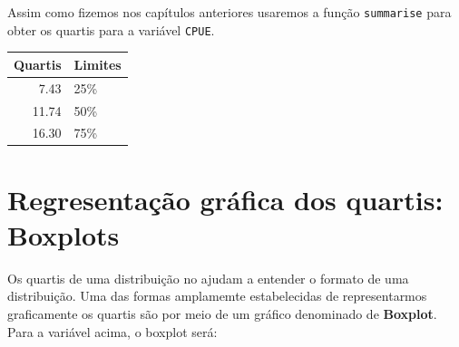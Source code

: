 \documentclass[
]{book}
\newenvironment{Shaded}{\begin{snugshade}}{\end{snugshade}}
\newcommand{\AttributeTok}[1]{\textcolor[rgb]{0.77,0.63,0.00}{#1}}
\newcommand{\FloatTok}[1]{\textcolor[rgb]{0.00,0.00,0.81}{#1}}
\newcommand{\FunctionTok}[1]{\textcolor[rgb]{0.00,0.00,0.00}{#1}}
\newcommand{\NormalTok}[1]{#1}
\newcommand{\SpecialCharTok}[1]{\textcolor[rgb]{0.00,0.00,0.00}{#1}}
\newcommand{\StringTok}[1]{\textcolor[rgb]{0.31,0.60,0.02}{#1}}
\begin{document}
Assim como fizemos nos capítulos anteriores usaremos a função \texttt{summarise} para obter os quartis para a variável \texttt{CPUE}.

\begin{Shaded}
\end{Shaded}

\begin{tabular}{r|l}
\hline
Quartis & Limites\\
\hline
7.43 & 25\%\\
\hline
11.74 & 50\%\\
\hline
16.30 & 75\%\\
\hline
\end{tabular}

\hypertarget{regresentauxe7uxe3o-gruxe1fica-dos-quartis-boxplots}{%
\section{Regresentação gráfica dos quartis: Boxplots}\label{regresentauxe7uxe3o-gruxe1fica-dos-quartis-boxplots}}

Os quartis de uma distribuição no ajudam a entender o formato de uma distribuição. Uma das formas amplamemte estabelecidas de representarmos graficamente os quartis são por meio de um gráfico denominado de \textbf{Boxplot}. Para a variável acima, o boxplot será:
\end{document}
